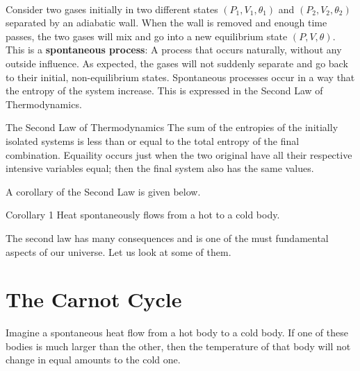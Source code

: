     \\
    Consider two gases initially in two different states $(P_1,V_1,\theta_1)$ and $(P_2,V_2,\theta_2)$ separated by an adiabatic wall. When the wall is removed and enough time passes, the two gases will mix and go into a new equilibrium state $(P,V,\theta)$. This is a \textbf{spontaneous process}: A process that occurs naturally, without any outside influence. As expected, the gases will not suddenly separate and go back to their initial, non-equilibrium states. Spontaneous processes occur in a way that the entropy of the system increase. This is expressed in the Second Law of Thermodynamics.
    \begin{law*}{The Second Law of Thermodynamics}
        The sum of the entropies of the initially isolated systems is less than or equal to the total entropy of the final combination. Equaility occurs just when the two original have all their respective intensive variables equal; then the final system also has the same values.
    \end{law*}
    A corollary of the Second Law is given below.
    \begin{lawcorollary*}{Corollary 1}
        Heat spontaneously flows from a hot to a cold body.
    \end{lawcorollary*}
    The second law has many consequences and is one of the must fundamental aspects of our universe. Let us look at some of them.
    \section{The Carnot Cycle}
    \label{sec:2.1Carnotcylce}
        Imagine a spontaneous heat flow from a hot body to a cold body. If one of these bodies is much larger than the other, then the temperature of that body will not change in equal amounts to the cold one. 
